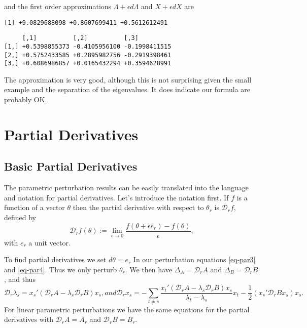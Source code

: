 \documentclass[
  12pt,
  letterpaper,
  DIV=11,
  numbers=noendperiod]{scrartcl}
\newcommand{\sectionbreak}{\clearpage}
\newcommand{\eps}{\epsilon}
\begin{document}
and the first order approximations \(\Lambda+\eps d\Lambda\) and
\(X+\eps dX\) are

\begin{verbatim}
[1] +9.0829688098 +0.8607699411 +0.5612612491
\end{verbatim}

\begin{verbatim}
     [,1]          [,2]          [,3]         
[1,] +0.5398855373 -0.4105956100 -0.1998411515
[2,] +0.5752433585 +0.2895982756 -0.2919398461
[3,] +0.6086986857 +0.0165432294 +0.3594628991
\end{verbatim}

The approximation is very good, although this is not surprising given
the small example and the separation of the eigenvalues. It does
indicate our formula are probably OK.

\sectionbreak

\section{Partial Derivatives}\label{sec-partial}

\subsection{Basic Partial Derivatives}\label{sec-parbasic}

The parametric perturbation results can be easily translated into the
language and notation for partial derivatives. Let's introduce the
notation first. If \(f\) is a function of a vector \(\theta\) then the
partial derivative with respect to \(\theta_r\) is \(\mathcal{D}_rf\),
defined by \[
\mathcal{D}_rf(\theta):=\lim_{\epsilon\rightarrow 0}\frac{f(\theta+\epsilon e_r)-f(\theta)}{\epsilon},
\] with \(e_r\) a unit vector.

To find partial derivatives we set \(d\theta=e_r\) In our perturbation
equations \eqref{eq-par3} and \eqref{eq-par4}. Thus we only perturb
\(\theta_r\). We then have \(\Delta_A=\mathcal{D}_rA\) and
\(\Delta_B=\mathcal{D}_rB\), and thus \begin{subequations}
\begin{equation}
\mathcal{D}_r\lambda_s=x_s'(\mathcal{D}_rA-\lambda_s\mathcal{D}_rB)x_s,\label{eq-parper1}
\end{equation}
and
\begin{equation}
\mathcal{D}_rx_s=-\sum_{t\not= s}\frac{x_t'(\mathcal{D}_rA-\lambda_s\mathcal{D}_rB)x_s}{\lambda_t-\lambda_s}x_t-\frac12(x_s'\mathcal{D}_rBx_s)x_s.\label{eq-parper2}
\end{equation}
\end{subequations} For linear parametric perturbations we have the same
equations for the partial derivatives with \(\mathcal{D}_rA=A_r\) and
\(\mathcal{D}_rB=B_r\).
\end{document}
